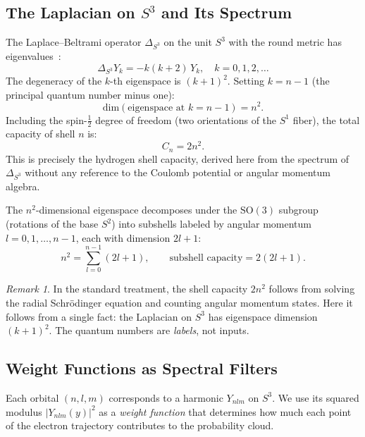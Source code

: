 \documentclass[12pt, a4paper]{article}
\theoremstyle{definition}
\theoremstyle{remark}
\newtheorem{remark}[theorem]{Remark}
\newcommand{\Sthree}{S^3}
\newcommand{\Stwo}{S^2}
\newcommand{\Sone}{S^1}
\newcommand{\SO}{\mathrm{SO}}
\newcommand{\lap}{\Delta_{\Sthree}}
\begin{document}
\subsection{The Laplacian on $\Sthree$ and Its Spectrum}

The Laplace--Beltrami operator $\lap$ on the unit $\Sthree$ with the round
metric has eigenvalues~\cite{bander1966,frankel2011}:
\begin{equation}
  \lap Y_k = -k(k+2)\, Y_k, \quad k = 0, 1, 2, \ldots
  \label{eq:eigenvalues}
\end{equation}
The degeneracy of the $k$-th eigenspace is $(k+1)^2$. Setting $k = n-1$
(the principal quantum number minus one):
\begin{equation}
  \text{dim}(\text{eigenspace at } k = n-1) = n^2.
  \label{eq:degeneracy}
\end{equation}
Including the spin-$\frac{1}{2}$ degree of freedom (two orientations of the
$\Sone$ fiber), the total capacity of shell $n$ is:
\begin{equation}
  \boxed{C_n = 2n^2.}
  \label{eq:shell_capacity}
\end{equation}
This is precisely the hydrogen shell capacity, derived here from the
spectrum of $\lap$ without any reference to the Coulomb potential or angular
momentum algebra.

The $n^2$-dimensional eigenspace decomposes under the $\SO(3)$ subgroup
(rotations of the base $\Stwo$) into subshells labeled by angular momentum
$l = 0, 1, \ldots, n-1$, each with dimension $2l+1$:
\begin{equation}
  n^2 = \sum_{l=0}^{n-1}(2l+1), \qquad
  \text{subshell capacity} = 2(2l+1).
  \label{eq:subshell}
\end{equation}

\begin{remark}
In the standard treatment, the shell capacity $2n^2$ follows from solving
the radial Schr\"odinger equation and counting angular momentum states. Here
it follows from a single fact: the Laplacian on $\Sthree$ has eigenspace
dimension $(k+1)^2$. The quantum numbers are \emph{labels}, not inputs.
\end{remark}

\subsection{Weight Functions as Spectral Filters}

Each orbital $(n, l, m)$ corresponds to a harmonic $Y_{nlm}$ on $\Sthree$.
We use its squared modulus $|Y_{nlm}(y)|^2$ as a \emph{weight function}
that determines how much each point of the electron trajectory contributes
to the probability cloud.
\end{document}
